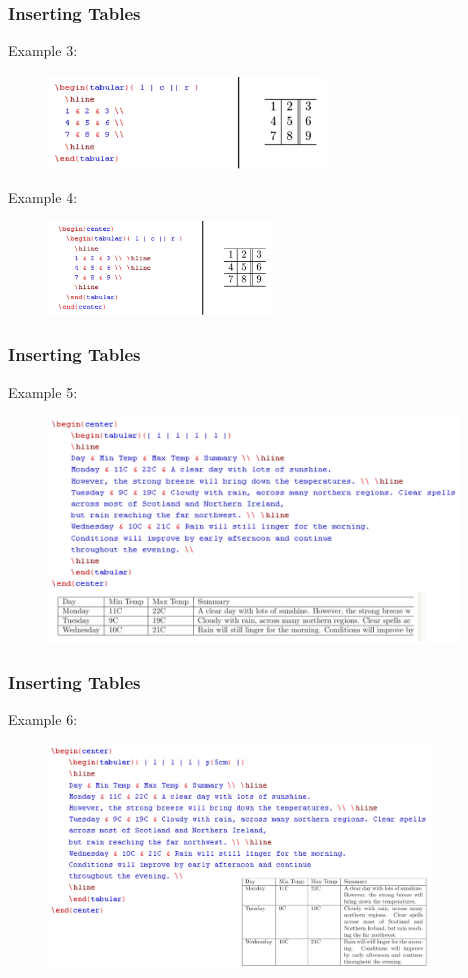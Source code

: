 \documentclass [9pt] {beamer}
\begin{document}
\begin{frame}\frametitle{Inserting Tables}
\rm
\fontsize{9pt}{11pt}\selectfont
Example 3:
\begin{figure}
\includegraphics[height=2.5cm]{tb3.png}
\end{figure}
Example 4:
\begin{figure}
\includegraphics[height=2.5cm]{tb4.png}
\end{figure}
\end{frame}

\begin{frame}\frametitle{Inserting Tables}
\rm
\fontsize{9pt}{11pt}\selectfont
Example 5:
\begin{figure}
\includegraphics[height=6cm]{tb5.png}
\end{figure}

\end{frame}

\begin{frame}\frametitle{Inserting Tables}
\rm
\fontsize{9pt}{11pt}\selectfont
Example 6:
\begin{figure}
\includegraphics[height=6cm]{tb6.png}
\end{figure}

\end{frame}
\end{document}
